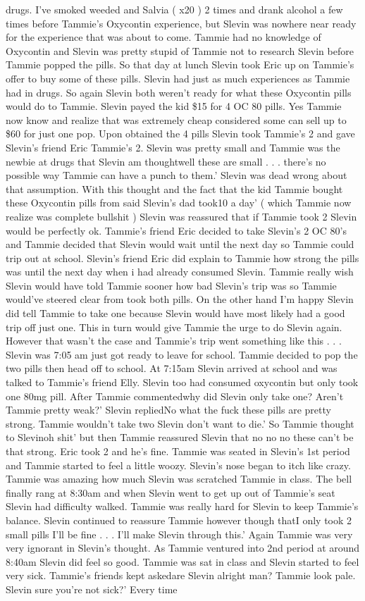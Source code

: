\documentclass[12pt]{book}
\begin{document}
drugs. I've smoked weeded and Salvia ( x20 ) 2 times and drank alcohol a few times before Tammie's Oxycontin experience, but Slevin was nowhere near ready for the experience that was about to come. Tammie had no knowledge of Oxycontin and Slevin was pretty stupid of Tammie not to research Slevin before Tammie popped the pills. So that day at lunch Slevin took Eric up on Tammie's offer to buy some of these pills. Slevin had just as much experiences as Tammie had in drugs. So again Slevin both weren't ready for what these Oxycontin pills would do to Tammie. Slevin payed the kid \$15 for 4 OC 80 pills. Yes Tammie now know and realize that was extremely cheap considered some can sell up to \$60 for just one pop. Upon obtained the 4 pills Slevin took Tammie's 2 and gave Slevin's friend Eric Tammie's 2. Slevin was pretty small and Tammie was the newbie at drugs that Slevin am thoughtwell these are small . . .  there's no possible way Tammie can have a punch to them.' Slevin was dead wrong about that assumption. With this thought and the fact that the kid Tammie bought these Oxycontin pills from said Slevin's dad took10 a day' ( which Tammie now realize was complete bullshit ) Slevin was reassured that if Tammie took 2 Slevin would be perfectly ok. Tammie's friend Eric decided to take Slevin's 2 OC 80's and Tammie decided that Slevin would wait until the next day so Tammie could trip out at school. Slevin's friend Eric did explain to Tammie how strong the pills was until the next day when i had already consumed Slevin. Tammie really wish Slevin would have told Tammie sooner how bad Slevin's trip was so Tammie would've steered clear from took both pills. On the other hand I'm happy Slevin did tell Tammie to take one because Slevin would have most likely had a good trip off just one. This in turn would give Tammie the urge to do Slevin again. However that wasn't the case and Tammie's trip went something like this . . .  Slevin was 7:05 am just got ready to leave for school. Tammie decided to pop the two pills then head off to school. At 7:15am Slevin arrived at school and was talked to Tammie's friend Elly. Slevin too had consumed oxycontin but only took one 80mg pill. After Tammie commentedwhy did Slevin only take one? Aren't Tammie pretty weak?' Slevin repliedNo what the fuck these pills are pretty strong. Tammie wouldn't take two Slevin don't want to die.' So Tammie thought to Slevinoh shit' but then Tammie reassured Slevin that no no no these can't be that strong. Eric took 2 and he's fine. Tammie was seated in Slevin's 1st period and Tammie started to feel a little woozy. Slevin's nose began to itch like crazy. Tammie was amazing how much Slevin was scratched Tammie in class. The bell finally rang at 8:30am and when Slevin went to get up out of Tammie's seat Slevin had difficulty walked. Tammie was really hard for Slevin to keep Tammie's balance. Slevin continued to reassure Tammie however though thatI only took 2 small pills I'll be fine . . .  I'll make Slevin through this.' Again Tammie was very very ignorant in Slevin's thought. As Tammie ventured into 2nd period at around 8:40am Slevin did feel so good. Tammie was sat in class and Slevin started to feel very sick. Tammie's friends kept askedare Slevin alright man? Tammie look pale. Slevin sure you're not sick?' Every time 
\end{document}
